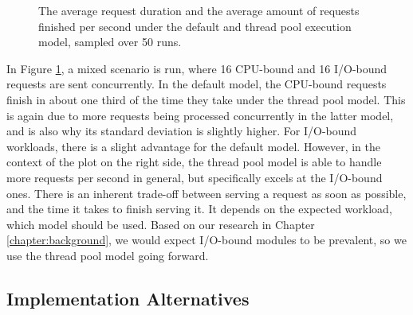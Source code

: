 \begin{figure}
    \begin{center}
        
    \end{center}
    \caption{The average request duration and the average amount of requests finished per second under the default and thread pool execution model, sampled over 50 runs.}
    \label{fig:default_vs_thread_pool_mixed}
\end{figure}

In Figure \ref{fig:default_vs_thread_pool_mixed}, a mixed scenario is run, where 16 CPU-bound and 16 I/O-bound requests are sent concurrently. In the default model, the CPU-bound requests finish in about one third of the time they take under the thread pool model. This is again due to more requests being processed concurrently in the latter model, and is also why its standard deviation is slightly higher. For I/O-bound workloads, there is a slight advantage for the default model. However, in the context of the plot on the right side, the thread pool model is able to handle more requests per second in general, but specifically excels at the I/O-bound ones. There is an inherent trade-off between serving a request as soon as possible, and the time it takes to finish serving it. It depends on the expected workload, which model should be used. Based on our research in Chapter \ref{chapter:background}, we would expect I/O-bound modules to be prevalent, so we use the thread pool model going forward.


\subsection{Implementation Alternatives}

